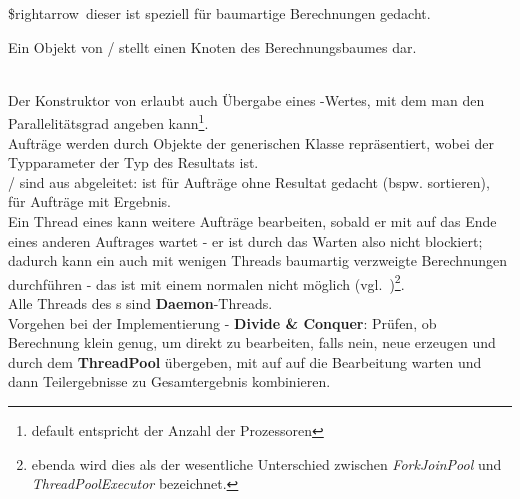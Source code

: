 \noindent
\$rightarrow\ dieser  ist speziell für baumartige Berechnungen gedacht.

\begin{tcolorbox}[enlarge top by=0.5cm,enlarge bottom by=0.5cm]
    Ein Objekt von  /  stellt einen Knoten des Berechnungsbaumes dar.
\end{tcolorbox}\\

\noindent
Der Konstruktor von  erlaubt auch Übergabe eines -Wertes, mit dem man den Parallelitätsgrad angeben kann\footnote{default entspricht der Anzahl der Prozessoren}.\\

\noindent
Aufträge werden durch Objekte der generischen Klasse  repräsentiert, wobei der Typparameter der Typ des Resultats ist.\\

\noindent
{}/ sind aus  abgeleitet:  ist für Aufträge ohne Resultat gedacht (bspw. sortieren),  für Aufträge mit Ergebnis.\\

\noindent
Ein Thread eines  kann weitere Aufträge bearbeiten, sobald er mit  auf das Ende eines anderen Auftrages wartet - er ist durch das Warten also nicht blockiert; dadurch kann ein  auch mit wenigen Threads baumartig verzweigte Berechnungen durchführen - das ist mit einem normalen  nicht möglich (vgl.~\cite[168]{Oec22})\footnote{
    ebenda wird dies als der wesentliche Unterschied zwischen \textit{ForkJoinPool} und \textit{ThreadPoolExecutor} bezeichnet.
}.\\

\noindent
Alle Threads des s sind \textbf{Daemon}-Threads.\\

\noindent
Vorgehen bei der Implementierung - \textbf{Divide \& Conquer}: Prüfen, ob Berechnung klein genug, um direkt zu bearbeiten, falls nein, neue  erzeugen und durch  dem \textbf{ThreadPool} übergeben, mit  auf auf die Bearbeitung warten und dann Teilergebnisse zu Gesamtergebnis kombinieren.\\

